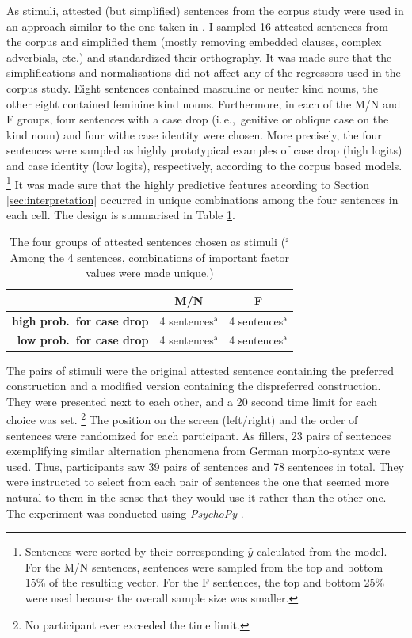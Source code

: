 \documentclass[USenglish]{article}
\newcommand{\ie}{i.\,e.,}
\newcommand{\Supsf}[1]{\ensuremath{\mathsf{^{#1}}}}
\begin{document}
As stimuli, attested (but simplified) sentences from the corpus study were used in an approach similar to the one taken in \cite{DivjakEa2016}.
I sampled 16 attested sentences from the corpus and simplified them (mostly removing embedded clauses, complex adverbials, etc.) and standardized their orthography.
It was made sure that the simplifications and normalisations did not affect any of the regressors used in the corpus study.
Eight sentences contained masculine or neuter kind nouns, the other eight contained feminine kind nouns.
Furthermore, in each of the M\slash N and F groups, four sentences with a case drop (\ie\ genitive or oblique case on the kind noun) and four withe case identity were chosen.
More precisely, the four sentences were sampled as highly prototypical examples of case drop (high logits) and case identity (low logits), respectively, according to the corpus based models.%
\footnote{Sentences were sorted by their corresponding $\hat{y}$ calculated from the model.
For the M\slash N sentences, sentences were sampled from the top and bottom 15\% of the resulting vector.
For the F sentences, the top and bottom 25\% were used because the overall sample size was smaller.}
It was made sure that the highly predictive features according to Section \ref{sec:interpretation} occurred in unique combinations among the four sentences in each cell.
The design is summarised in Table \ref{tab:experiment1:design}.

\begin{table}
  \centering
  \begin{tabular}[h]{rcc}
     & M\slash N & F \\
     \midrule
     \textbf{high prob.\ for case drop} & 4 sentences\Supsf{a} & 4 sentences\Supsf{a} \\
     \textbf{low prob.\ for case drop} & 4 sentences\Supsf{a} & 4 sentences\Supsf{a} \\
  \end{tabular}
  \caption{The four groups of attested sentences chosen as stimuli (\Supsf{a}Among the 4 sentences, combinations of important factor values were made unique.)}
  \label{tab:experiment1:design}
\end{table}

The pairs of stimuli were the original attested sentence containing the preferred construction and a modified version containing the dispreferred construction.
They were presented next to each other, and a 20 second time limit for each choice was set.%
\footnote{No participant ever exceeded the time limit.}
The position on the screen (left\slash right) and the order of sentences were randomized for each participant.
As fillers, 23 pairs of sentences exemplifying similar alternation phenomena from German morpho-syntax were used.
Thus, participants saw 39 pairs of sentences and 78 sentences in total.
They were instructed to select from each pair of sentences the one that seemed more natural to them in the sense that they would use it rather than the other one.
The experiment was conducted using \textit{PsychoPy} \citep{Peirce2007}.
\end{document}
